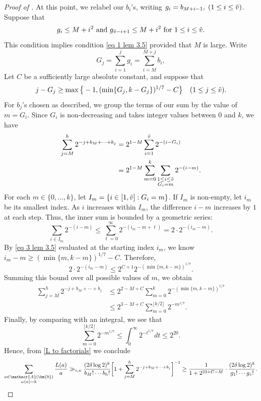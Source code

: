 \documentclass{amsart}
\theoremstyle{definition}
\numberwithin{equation}{section}
\newcommand{\density}{\delta}
\begin{document}
\begin{proof}[Proof of ]
	At this point, we relabel our $b_i$'s, writing $g_i = b_{M+i-1},\;(1 \leq i \leq \Tilde{v})$. Suppose that 
	\begin{equation}\label{eq 2 lem 3.5}
		g_i \leq M+i^2\text{ and } g_{\Tilde{v}-i+1} \leq M+i^2 \text{ for } 1 \leq i \leq \Tilde{v}.
	\end{equation}
	This condition implies condition \eqref{eq 1 lem 3.5} provided that $M$ is large. Write $$G_j = \sum_{i = 1}^j g_i = \sum_{i = M}^{M+j}b_i,$$ Let $C$ be a sufficiently large absolute constant, and suppose that
	\begin{equation}\label{eq 3 lem 3.5}
		j - G_j \geq \max \big\{-1,(\min\{G_j,k-G_j\})^{1/7}-C\big\} \quad (1 \leq j \leq \Tilde{v}).
	\end{equation}
	For $b_j$'s chosen as described, we group the terms of our sum by the value of $m = G_i$. Since $G_i$ is non-decreasing and takes integer values between $0$ and $k$, we have
	\begin{align*}
		\sum_{j =M}^h 2^{-j +b_M+\cdots +b_j} &= 2^{1-M}\sum_{i=1}^{\Tilde{v}} 2^{-(i -G_{i})} \\
		&= 2^{1-M} \sum_{m=0}^k \sum_{\substack{1 \leq i \leq \Tilde{v} \\ G_i = m}} 2^{-(i-m)}.
	\end{align*}
	For each $m \in \{0, \dots, k\}$, let $I_m = \{i \in [1,\Tilde{v}] : G_i = m\}$. If $I_m$ is non-empty, let $i_m$ be its smallest index. As $i$ increases within $I_m$, the difference $i-m$ increases by $1$ at each step. Thus, the inner sum is bounded by a geometric series:
	$$ \sum_{i \in I_m} 2^{-(i-m)} \leq \sum_{\ell = 0}^\infty 2^{-(i_m - m + \ell)} = 2 \cdot 2^{-(i_m - m)}. $$
	By \eqref{eq 3 lem 3.5} evaluated at the starting index $i_m$, we know $i_m - m \geq (\min\{m,k-m\})^{1/7} - C$. Therefore,
	$$ 2 \cdot 2^{-(i_m - m)} \leq 2^{C+1} 2^{-(\min\{m,k-m\})^{1/7}}. $$
	Summing this bound over all possible values of $m$, we obtain
	\begin{align*}
		\sum_{j =M}^h 2^{-j +b_M+\cdots +b_j} &\leq 2^{2-M+C} \sum_{m=0}^k 2^{-(\min\{m,k-m\})^{1/7}} \\
		&\leq 2^{3-M+C} \sum_{m=0}^{\lfloor k/2 \rfloor} 2^{-m^{1/7}}.
	\end{align*}
	Finally, by comparing with an integral, we see that 
	$$\sum_{m=0}^{\lfloor k/2 \rfloor} 2^{-m^{1/7}} \leq \int_0^\infty 2^{-t^{1/7}}dt \leq 2^{20}.$$
	Hence, from \eqref{L to factorials} we conclude
	\begin{equation*}
		\sum_{\substack{a \in \mathscr{A}(\bm{b}) \\ \omega(a) = k}} \frac{L(a)}{a} \gg_{c,\kappa}  \frac{(2 \density \log 2)^k}{b_M! \cdots b_h!} \bigg[ 1 + \sum_{j =M}^h 2^{-j +b_M + \cdots +b_j} \bigg]^{-1} \ge \frac{1}{1+2^{23+C-M}} \cdot \frac{(2 \density \log 2)^k}{g_1! \cdots g_{\Tilde{v}}!}.

\end{equation*}
\end{proof}
\end{document}
